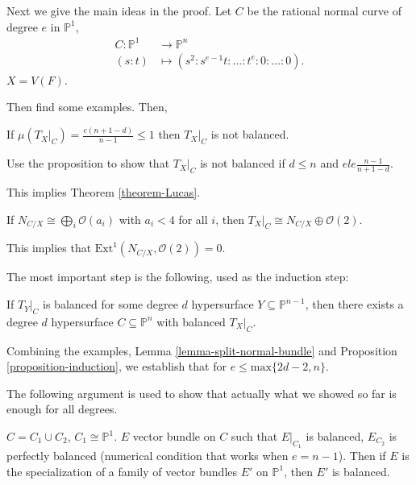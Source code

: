 Next we give the main ideas in the proof.
Let $C$ be the rational normal curve
of degree $e$ in $\mathbb{P}^1$,
$$
\begin{aligned}
C:\mathbb{P}^1  &\longrightarrow \mathbb{P}^n
\\
(s:t) &\longmapsto
(s^2:s^{e-1}t:\ldots:t^e:0:\ldots:0).
\end{aligned}
$$
$X=V(F)$.

Then find some examples. Then,

\begin{proposition}
\label{proposition-proposition}
If $\mu(T_X|_{C})=\frac{e(n+1-d)}{n-1}\leq 1$
then $T_X|_{C}$ is not balanced.
\end{proposition}

\noindent
Use the proposition to show that $T_X|_C$
is not balanced if $d \leq  n$
and $e le \frac{ n-1}{n+1-d}$.

This implies Theorem \ref{theorem-Lucas}.

\begin{lemma}
\label{lemma-split-normal-bundle}
If $N_{C/X}\cong \bigoplus_i
\mathcal{O}(a_i)$
with $a_i < 4$ for all $i$,
then $T_{X}|_C \cong N_{C/X} \oplus
\mathcal{O}(2)$.
\end{lemma}

\noindent
This implies that
$\text{Ext}^1(N_{C/X},\mathcal{O}(2))=0$.

The most important step is the following,
used as the induction step:

\begin{proposition}
\label{proposition-induction}
If $T_Y|_C$ is balanced for some degree $d$
hypersurface $Y \subseteq \mathbb{P}^{n-1}$,
then there exists a degree $d$ hypersurface
$C \subseteq \mathbb{P}^n$ with balanced
$T_X|_C$.
\end{proposition}

\noindent
Combining the examples, Lemma
\ref{lemma-split-normal-bundle}
and Proposition \ref{proposition-induction},
we establish that for $e \leq
\text{max}\{2d-2,n\}$.

The following argument is used to show that
actually what we showed so far is enough for
all degrees.

\begin{lemma}
\label{lemma-smoothing-argument}
$C=C_1 \cup  C_2$, $C_1 \cong \mathbb{P}^1$.
$E$ vector bundle on $C$ such that
$E|_{C_1}$ is balanced,
$E_{C_2}$ is perfectly balanced
(numerical condition that works when
$e=n-1$).
Then if $E$ is the specialization of a family
of vector bundles $E'$ on $\mathbb{P}^1$,
then $E'$ is balanced.
\end{lemma}

